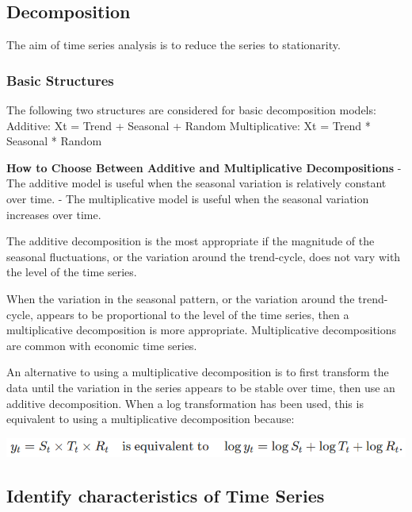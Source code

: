\documentclass[
]{article}
\begin{document}
\hypertarget{decomposition}{%
\subsection{Decomposition}\label{decomposition}}

The aim of time series analysis is to reduce the series to stationarity.

\hypertarget{basic-structures}{%
\subsubsection{Basic Structures}\label{basic-structures}}

The following two structures are considered for basic decomposition
models: Additive: Xt = Trend + Seasonal + Random Multiplicative: Xt =
Trend * Seasonal * Random

\textbf{How to Choose Between Additive and Multiplicative
Decompositions} - The additive model is useful when the seasonal
variation is relatively constant over time. - The multiplicative model
is useful when the seasonal variation increases over time.

The additive decomposition is the most appropriate if the magnitude of
the seasonal fluctuations, or the variation around the trend-cycle, does
not vary with the level of the time series.

When the variation in the seasonal pattern, or the variation around the
trend-cycle, appears to be proportional to the level of the time series,
then a multiplicative decomposition is more appropriate. Multiplicative
decompositions are common with economic time series.

An alternative to using a multiplicative decomposition is to first
transform the data until the variation in the series appears to be
stable over time, then use an additive decomposition. When a log
transformation has been used, this is equivalent to using a
multiplicative decomposition because:

\includegraphics[width=1\linewidth]{components}

\hypertarget{identify-characteristics-of-time-series}{%
\subsection{Identify characteristics of Time
Series}\label{identify-characteristics-of-time-series}}
\end{document}
